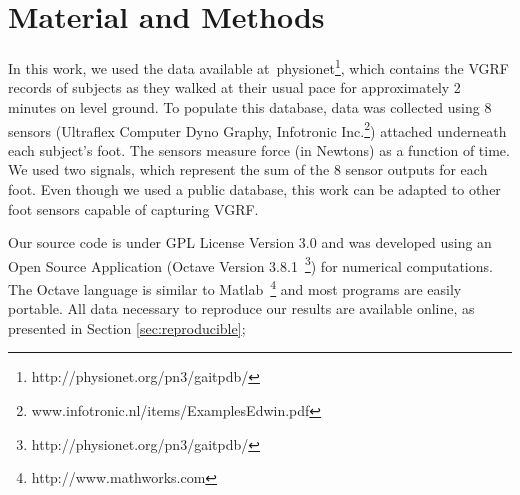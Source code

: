 \documentclass[10pt, conference, compsocconf]{IEEEtran}
\begin{document}



\section{Material and Methods}\label{sec:mat_methods}
In this work, we used the data available at~{physionet}\footnote{http://physionet.org/pn3/gaitpdb/}, which contains the VGRF records of subjects as they walked at their usual pace for approximately 2 minutes on level ground. To populate this database, data was collected using 8 sensors (Ultraflex Computer Dyno Graphy, Infotronic Inc.\footnote{www.infotronic.nl/items/ExamplesEdwin.pdf}) attached underneath each subject's foot. The sensors measure force (in Newtons) as a function of time. We used two signals, which represent the sum of the 8 sensor outputs for each foot. Even though we used a public database, this work can be adapted to other foot sensors capable of capturing VGRF.

Our source code is under GPL License Version 3.0 and was developed using an Open Source Application (Octave Version 3.8.1~\footnote{http://physionet.org/pn3/gaitpdb/}) for numerical computations. The Octave language is similar to Matlab~\footnote{http://www.mathworks.com} and most programs are easily portable. All data necessary to reproduce our results are available online, as presented in Section \ref{sec:reproducible};
\end{document}
